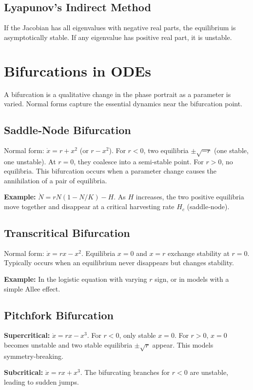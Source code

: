 \documentclass[12pt,a4paper]{book}
\begin{document}
\subsection{Lyapunov's Indirect Method}
If the Jacobian has all eigenvalues with negative real parts, the equilibrium is asymptotically stable. If any eigenvalue has positive real part, it is unstable.

\section{Bifurcations in ODEs}
A bifurcation is a qualitative change in the phase portrait as a parameter is varied. Normal forms capture the essential dynamics near the bifurcation point.

\subsection{Saddle‑Node Bifurcation}
Normal form: $\dot{x} = r + x^2$ (or $r - x^2$). For $r<0$, two equilibria $\pm\sqrt{-r}$ (one stable, one unstable). At $r=0$, they coalesce into a semi‑stable point. For $r>0$, no equilibria. This bifurcation occurs when a parameter change causes the annihilation of a pair of equilibria.

\textbf{Example:} $\dot{N} = rN(1 - N/K) - H$. As $H$ increases, the two positive equilibria move together and disappear at a critical harvesting rate $H_c$ (saddle‑node).

\subsection{Transcritical Bifurcation}
Normal form: $\dot{x} = r x - x^2$. Equilibria $x=0$ and $x=r$ exchange stability at $r=0$. Typically occurs when an equilibrium never disappears but changes stability.

\textbf{Example:} In the logistic equation with varying $r$ sign, or in models with a simple Allee effect.

\subsection{Pitchfork Bifurcation}
\textbf{Supercritical:} $\dot{x} = r x - x^3$. For $r<0$, only stable $x=0$. For $r>0$, $x=0$ becomes unstable and two stable equilibria $\pm\sqrt{r}$ appear. This models symmetry‑breaking.

\textbf{Subcritical:} $\dot{x} = r x + x^3$. The bifurcating branches for $r<0$ are unstable, leading to sudden jumps.
\end{document}
